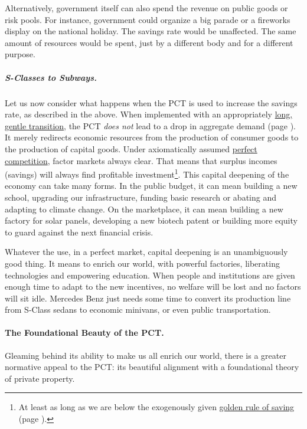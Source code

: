 Alternatively, government itself can also spend the revenue on public goods or risk pools. For instance, government could organize a big parade or a fireworks display on the national holiday. The savings rate would be unaffected. The same amount of resources would be spent, just by a different body and for a different purpose.

\subparagraph{S-Classes to Subways.} Let us now consider what happens when the PCT is used to increase the savings rate, as described in the above. When implemented with an appropriately \hyperref[sec:GoSlow]{long, gentle transition}, the PCT \emph{does not} lead to a drop in aggregate demand (page \pageref{sec:GoSlow}). It merely redirects economic resources from the production of consumer goods to the production of capital goods. Under axiomatically assumed \hyperref[sec:PerfectCompetition]{perfect competition}, factor markets always clear. That means that surplus incomes (savings) will always find profitable investment\footnote{
	At least as long as we are below the exogenously given \hyperref[eq:GoldenRuleSavings]{golden rule of saving} (page \pageref{eq:GoldenRuleSavings}).}. 
This capital deepening of the economy can take many forms. In the public budget, it can mean building a new school, upgrading our infrastructure, funding basic research or abating and adapting to climate change. On the marketplace, it can mean building a new factory for solar panels, developing a new biotech patent or building more equity to guard against the next financial crisis. 

Whatever the use, in a perfect market, capital deepening is an unambiguously good thing. It means to enrich our world, with powerful
factories, liberating technologies and empowering education. When people and institutions are given enough time to adapt to the new incentives, no welfare will be lost and no factors will sit idle. Mercedes Benz just needs some time to convert its production line from S-Class sedans to economic minivans, or even public transportation.


\paragraph{The Foundational Beauty of the PCT.}  \label{sec:FoundationalBeauty} Gleaming behind its ability to make us all enrich our world, there is a greater normative appeal to the PCT: its beautiful alignment with a foundational theory of private property.


